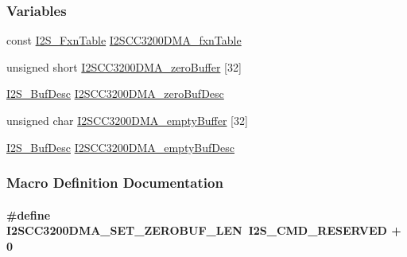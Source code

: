 \subsubsection*{Variables}
\begin{DoxyCompactItemize}
\item 
const \hyperlink{struct_i2_s___fxn_table}{I2\+S\+\_\+\+Fxn\+Table} \hyperlink{_i2_s_c_c3200_d_m_a_8h_a3ca5ac11f1c32271d9522f38a29027e9}{I2\+S\+C\+C3200\+D\+M\+A\+\_\+fxn\+Table}
\item 
unsigned short \hyperlink{_i2_s_c_c3200_d_m_a_8h_ace2f776a3d3a454a9d0ca4d6235847d5}{I2\+S\+C\+C3200\+D\+M\+A\+\_\+zero\+Buffer} \mbox{[}32\mbox{]}
\item 
\hyperlink{struct_i2_s___buf_desc}{I2\+S\+\_\+\+Buf\+Desc} \hyperlink{_i2_s_c_c3200_d_m_a_8h_a7421ee729c35597dc64cd1b90941cbd5}{I2\+S\+C\+C3200\+D\+M\+A\+\_\+zero\+Buf\+Desc}
\item 
unsigned char \hyperlink{_i2_s_c_c3200_d_m_a_8h_a073483177d241d51a7a10cfdd95ff8ba}{I2\+S\+C\+C3200\+D\+M\+A\+\_\+empty\+Buffer} \mbox{[}32\mbox{]}
\item 
\hyperlink{struct_i2_s___buf_desc}{I2\+S\+\_\+\+Buf\+Desc} \hyperlink{_i2_s_c_c3200_d_m_a_8h_a6b20a23a7703adbae25bfcbba2529481}{I2\+S\+C\+C3200\+D\+M\+A\+\_\+empty\+Buf\+Desc}
\end{DoxyCompactItemize}


\subsubsection{Macro Definition Documentation}
\paragraph[{I2\+S\+C\+C3200\+D\+M\+A\+\_\+\+S\+E\+T\+\_\+\+Z\+E\+R\+O\+B\+U\+F\+\_\+\+L\+E\+N}]{\setlength{\rightskip}{0pt plus 5cm}\#define I2\+S\+C\+C3200\+D\+M\+A\+\_\+\+S\+E\+T\+\_\+\+Z\+E\+R\+O\+B\+U\+F\+\_\+\+L\+E\+N~{\bf I2\+S\+\_\+\+C\+M\+D\+\_\+\+R\+E\+S\+E\+R\+V\+E\+D} + 0}\label{_i2_s_c_c3200_d_m_a_8h_a4fc87c0d5ba35cbd7dd5106777df30e9}
